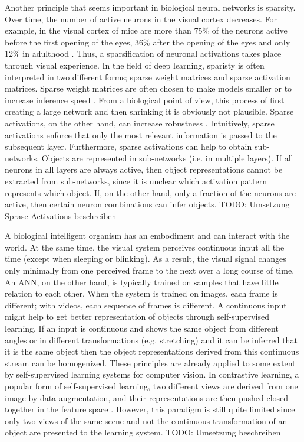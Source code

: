 Another principle that seems important in biological neural networks is sparsity.
Over time, the number of active neurons in the visual cortex decreases.
For example, in the visual cortex of mice are more than 75\% of the neurons active before the first opening of the eyes, 36\% after the opening of the eyes and only 12\% in adulthood .
Thus, a sparsification of neuronal activations takes place through visual experience.
In the field of deep learning, sparisty is often interpreted in two different forms; sparse weight matrices and sparse activation matrices.
Sparse weight matrices are often chosen to make models smaller or to increase inference speed \cite{Louizos_Welling_Kingma_2018, Hoefler_Alistarh_Ben_Nun_Dryden_Peste_2021}.
From a biological point of view, this process of first creating a large network and then shrinking it is obviously not plausible.
Sparse activations, on the other hand, can increase robustness \cite{Panousis_Chatzis_Theodoridis_2021}.
Intuitively, sparse activations enforce that only the most relevant information is passed to the subsequent layer.
Furthermore, sparse activations can help to obtain sub-networks.
Objects are represented in sub-networks (i.e. in multiple layers).
If all neurons in all layers are always active, then object representations cannot be extracted from sub-networks, since it is unclear which activation pattern represents which object.
If, on the other hand, only a fraction of the neurons are active, then certain neuron combinations can infer objects.
TODO: Umsetzung Sprase Activations beschreiben

A biological intelligent organism has an embodiment and can interact with the world.
At the same time, the visual system perceives continuous input all the time (except when sleeping or blinking).
As a result, the visual signal changes only minimally from one perceived frame to the next over a long course of time.
An ANN, on the other hand, is typically trained on samples that have little relation to each other.
When the system is trained on images, each frame is different; with videos, each sequence of frames is different.
A continuous input might help to get better representation of objects through self-supervised learning.
If an input is continuous and shows the same object from different angles or in different transformations (e.g. stretching) and it can be inferred that it is the same object then the object representations derived from this continuous stream can be homogenized.
These principles are already applied to some extent by self-supervised learning systems for computer vision.
In contrastive learning, a popular form of self-supervised learning, two different views are derived from one image by data augmentation, and their representations are then pushed closed together in the feature space .
However, this paradigm is still quite limited since only two views of the same scene and not the continuous transformation of an object are presented to the learning system.
TODO: Umsetzung beschreiben


